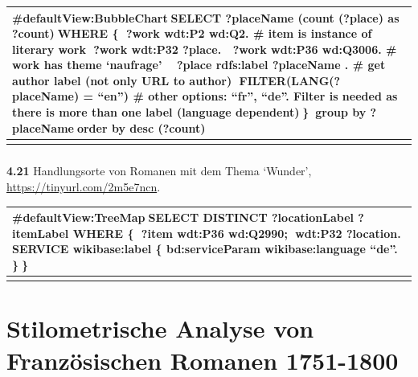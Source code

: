 \documentclass[
  12pt,
  letterpaper,
  DIV=11,
  numbers=noendperiod]{scrreprt}
\makeatletter
\let\oldparagraph\paragraph
\renewcommand{\paragraph}{
    \@ifstar
      \xxxParagraphStar
      \xxxParagraphNoStar
  }
\newcommand{\xxxParagraphStar}[1]{\oldparagraph*{#1}\mbox{}}
\newcommand{\xxxParagraphNoStar}[1]{\oldparagraph{#1}\mbox{}}
\makeatother
\begin{document}
\begin{longtable}[]{@{}
  >{\raggedright\arraybackslash}p{}@{}}
\toprule\noalign{}
\begin{minipage}[b]{\linewidth}\raggedright
\#defaultView:BubbleChartSELECT ?placeName (count (?place) as
?count)WHERE \{ ?work wdt:P2 wd:Q2. \# item is instance of literary work
?work wdt:P32 ?place.  ?work wdt:P36 wd:Q3006. \# work has theme
`naufrage'  ?place rdfs:label ?placeName . \# get author label (not only
URL to author) FILTER(LANG(?placeName) = ``en'') \# other options:
``fr'', ``de''. Filter is needed as there is more than one label
(language dependent)\}group by ?placeNameorder by desc (?count)
\end{minipage} \\
\midrule\noalign{}
\endhead
\bottomrule\noalign{}
\endlastfoot
\end{longtable}

\paragraph{}\label{section-8}

\paragraph{\texorpdfstring{\textbf{4.21} Handlungsorte von Romanen mit
dem Thema `Wunder',
\url{https://tinyurl.com/2m5e7ncn}.}{4.21 Handlungsorte von Romanen mit dem Thema `Wunder', https://tinyurl.com/2m5e7ncn.}}\label{handlungsorte-von-romanen-mit-dem-thema-wunder-httpstinyurl.com2m5e7ncn.}

\begin{longtable}[]{@{}
  >{\raggedright\arraybackslash}p{}@{}}
\toprule\noalign{}
\begin{minipage}[b]{\linewidth}\raggedright
\#defaultView:TreeMapSELECT DISTINCT ?locationLabel ?itemLabel WHERE \{
?item wdt:P36 wd:Q2990; wdt:P32 ?location. SERVICE wikibase:label \{
bd:serviceParam wikibase:language ``de''. \}\}
\end{minipage} \\
\midrule\noalign{}
\endhead
\bottomrule\noalign{}
\endlastfoot
\end{longtable}


\chapter{Stilometrische Analyse von Französischen Romanen
1751-1800}\label{stilometrische-analyse-von-franzuxf6sischen-romanen-1751-1800}
\end{document}
